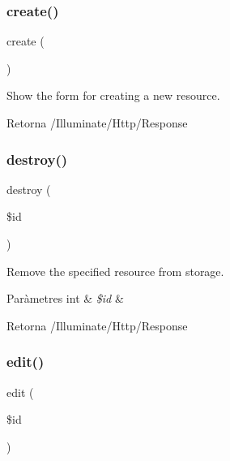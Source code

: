 \subsubsection{\texorpdfstring{create()}{create()}}
{\footnotesize\ttfamily create (\begin{DoxyParamCaption}{ }\end{DoxyParamCaption})}

Show the form for creating a new resource.

\begin{DoxyReturn}{Retorna}
/\+Illuminate/\+Http/\+Response 
\end{DoxyReturn}
\mbox{\label{class_app_1_1_http_1_1_controllers_1_1gestio_productes_a726fa8a4b4b187b9ca32ba427aac8137}} 
\subsubsection{\texorpdfstring{destroy()}{destroy()}}
{\footnotesize\ttfamily destroy (\begin{DoxyParamCaption}\item[{}]{\$id }\end{DoxyParamCaption})}

Remove the specified resource from storage.


\begin{DoxyParams}[1]{Paràmetres}
int & {\em \$id} & \\
\hline
\end{DoxyParams}
\begin{DoxyReturn}{Retorna}
/\+Illuminate/\+Http/\+Response 
\end{DoxyReturn}
\mbox{\label{class_app_1_1_http_1_1_controllers_1_1gestio_productes_a459ed16587e3a50b39b672c7e473abc5}} 
\subsubsection{\texorpdfstring{edit()}{edit()}}
{\footnotesize\ttfamily edit (\begin{DoxyParamCaption}\item[{}]{\$id }\end{DoxyParamCaption})}

